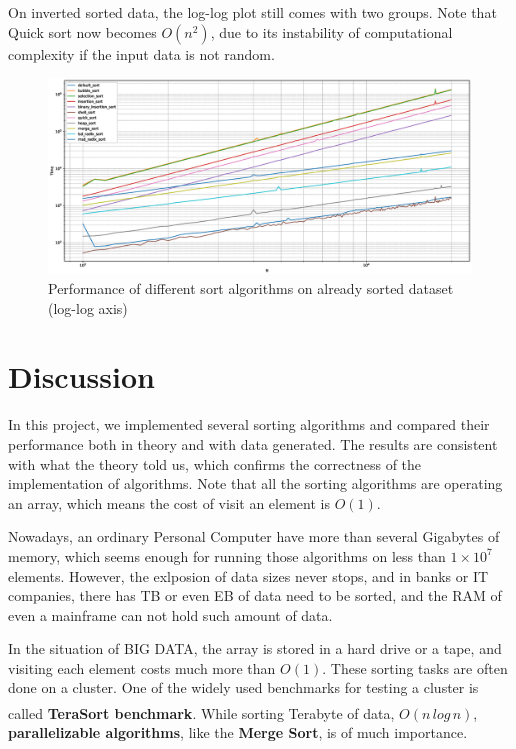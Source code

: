\documentclass[cn,black,12pt,normal]{elegantnote}
\newcommand{\uct}[1]{\textsuperscript{\textsuperscript{\cite{#1}}}}
\begin{document}
On inverted sorted data, the log-log plot still comes with two groups. Note that Quick sort now becomes $O(n^2)$, due to its instability of computational complexity if the input data is not random.
\begin{figure}[H]
    \centering
    \includegraphics[width=1.0\linewidth]{image/inv.eps}
    \caption{Performance of different sort algorithms on already sorted dataset (log-log axis)}
\end{figure}

\section{Discussion}

In this project, we implemented several sorting algorithms and compared their performance both in theory and with data generated. The results are consistent with what the theory told us, which confirms the correctness of the implementation of algorithms. Note that all the sorting algorithms are operating an array, which means the cost of visit an element is $O(1)$.

Nowadays, an ordinary Personal Computer have more than several Gigabytes of memory, which seems enough for running those algorithms on less than $1\times10^7$ elements. However, the exlposion of data sizes never stops, and in banks or IT companies, there has TB or even EB of data need to be sorted, and the RAM of even a mainframe can not hold such amount of data.

In the situation of BIG DATA, the array is stored in a hard drive or a tape, and visiting each element costs much more than $O(1)$. These sorting tasks are often done on a cluster. One of the widely used benchmarks for testing a cluster is called \textbf{TeraSort benchmark}.\uct{o2008terabyte} While sorting Terabyte of data, $O(n\,log\,n)$, \textbf{parallelizable algorithms}, like the \textbf{Merge Sort}, is of much importance. 

\newpage

\end{document}
